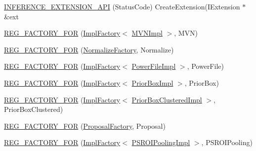 \begin{DoxyCompactItemize}
\hyperlink{namespaceInferenceEngine_1_1Extensions_1_1Cpu_a7abde1f12dfc3d1ee7af31d4307bcac8}{I\+N\+F\+E\+R\+E\+N\+C\+E\+\_\+\+E\+X\+T\+E\+N\+S\+I\+O\+N\+\_\+\+A\+PI} (Status\+Code) Create\+Extension(I\+Extension $\ast$\&ext
\item 
\hyperlink{namespaceInferenceEngine_1_1Extensions_1_1Cpu_a735b42b834340de09aa6aae93acb9674}{R\+E\+G\+\_\+\+F\+A\+C\+T\+O\+R\+Y\+\_\+\+F\+OR} (\hyperlink{classInferenceEngine_1_1Extensions_1_1Cpu_1_1ImplFactory}{Impl\+Factory}$<$ \hyperlink{classInferenceEngine_1_1Extensions_1_1Cpu_1_1MVNImpl}{M\+V\+N\+Impl} $>$, M\+VN)
\item 
\hyperlink{namespaceInferenceEngine_1_1Extensions_1_1Cpu_ada248724c32ba04d76e69aef03048ccc}{R\+E\+G\+\_\+\+F\+A\+C\+T\+O\+R\+Y\+\_\+\+F\+OR} (\hyperlink{classInferenceEngine_1_1Extensions_1_1Cpu_1_1NormalizeFactory}{Normalize\+Factory}, Normalize)
\item 
\hyperlink{namespaceInferenceEngine_1_1Extensions_1_1Cpu_a1e44e9cd708be96c4e3362f0912d5880}{R\+E\+G\+\_\+\+F\+A\+C\+T\+O\+R\+Y\+\_\+\+F\+OR} (\hyperlink{classInferenceEngine_1_1Extensions_1_1Cpu_1_1ImplFactory}{Impl\+Factory}$<$ \hyperlink{classInferenceEngine_1_1Extensions_1_1Cpu_1_1PowerFileImpl}{Power\+File\+Impl} $>$, Power\+File)
\item 
\hyperlink{namespaceInferenceEngine_1_1Extensions_1_1Cpu_a9d1d98774a4722c95921abb9ff78d880}{R\+E\+G\+\_\+\+F\+A\+C\+T\+O\+R\+Y\+\_\+\+F\+OR} (\hyperlink{classInferenceEngine_1_1Extensions_1_1Cpu_1_1ImplFactory}{Impl\+Factory}$<$ \hyperlink{classInferenceEngine_1_1Extensions_1_1Cpu_1_1PriorBoxImpl}{Prior\+Box\+Impl} $>$, Prior\+Box)
\item 
\hyperlink{namespaceInferenceEngine_1_1Extensions_1_1Cpu_af26898e3dafe2e8f53741eb13837e7ae}{R\+E\+G\+\_\+\+F\+A\+C\+T\+O\+R\+Y\+\_\+\+F\+OR} (\hyperlink{classInferenceEngine_1_1Extensions_1_1Cpu_1_1ImplFactory}{Impl\+Factory}$<$ \hyperlink{classInferenceEngine_1_1Extensions_1_1Cpu_1_1PriorBoxClusteredImpl}{Prior\+Box\+Clustered\+Impl} $>$, Prior\+Box\+Clustered)
\item 
\hyperlink{namespaceInferenceEngine_1_1Extensions_1_1Cpu_a6ee5732c26d3b9e1abc4740ffdb9a6a0}{R\+E\+G\+\_\+\+F\+A\+C\+T\+O\+R\+Y\+\_\+\+F\+OR} (\hyperlink{classInferenceEngine_1_1Extensions_1_1Cpu_1_1ProposalFactory}{Proposal\+Factory}, Proposal)
\item 
\hyperlink{namespaceInferenceEngine_1_1Extensions_1_1Cpu_a5b7843bb0d20c76253676f9736a4f719}{R\+E\+G\+\_\+\+F\+A\+C\+T\+O\+R\+Y\+\_\+\+F\+OR} (\hyperlink{classInferenceEngine_1_1Extensions_1_1Cpu_1_1ImplFactory}{Impl\+Factory}$<$ \hyperlink{classInferenceEngine_1_1Extensions_1_1Cpu_1_1PSROIPoolingImpl}{P\+S\+R\+O\+I\+Pooling\+Impl} $>$, P\+S\+R\+O\+I\+Pooling)

\end{DoxyCompactItemize}
